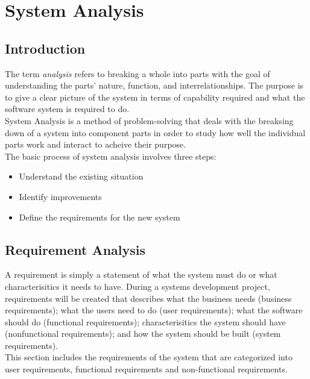 \documentclass[twoside, a4paper, 12pt]{report}
\begin{document}
\chapter{System Analysis}
\section{Introduction}
The term \textit{analysis} refers to breaking a whole into parts with the goal of understanding the parts' nature, function, and interrelationships. The purpose is to give a clear picture of the system in terms of capability required and what the software system is required to do.\autocite{dennis2009systems} \\
\indent
System Analysis is a method of problem-solving that deals with the breaksing down of a system into component parts in order to study how well the individual parts work and interact to acheive their purpose.\\
\indent
The basic process of system analysis involves three steps:
\begin{itemize}
	\item Understand the existing situation
	\item Identify improvements
	\item Define the requirements for the new system
\end{itemize}

\section{Requirement Analysis}
A requirement is simply a statement of what the system must do or what characterisitics it needs to have. During a systems development project, requirements will be created that describes what the business needs (business requirements); what the users need to do (user requirements); what the software should do (functional requirements); characterisitics the system should have (nonfunctional requirements); and how the system should be built (system requirements).\\
\indent
This section includes the requirements of the system that are categorized into user requirements, functional requirements and non-functional requirements.
\end{document}
